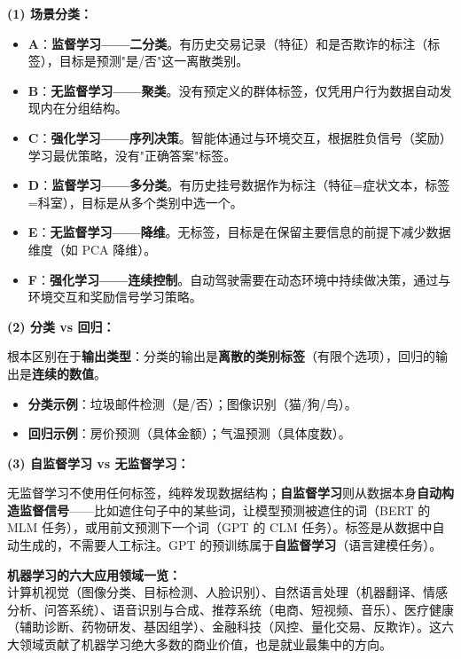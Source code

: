 \documentclass[a4paper,11pt]{ctexart}
\begin{document}
\begin{solutionbox}[参考答案与详细解析]
    \textbf{(1) 场景分类：}
    \begin{itemize}
        \item \textbf{A}：\textbf{监督学习——二分类}。有历史交易记录（特征）和是否欺诈的标注（标签），目标是预测"是/否"这一离散类别。
        \item \textbf{B}：\textbf{无监督学习——聚类}。没有预定义的群体标签，仅凭用户行为数据自动发现内在分组结构。
        \item \textbf{C}：\textbf{强化学习——序列决策}。智能体通过与环境交互，根据胜负信号（奖励）学习最优策略，没有"正确答案"标签。
        \item \textbf{D}：\textbf{监督学习——多分类}。有历史挂号数据作为标注（特征=症状文本，标签=科室），目标是从多个类别中选一个。
        \item \textbf{E}：\textbf{无监督学习——降维}。无标签，目标是在保留主要信息的前提下减少数据维度（如 PCA 降维）。
        \item \textbf{F}：\textbf{强化学习——连续控制}。自动驾驶需要在动态环境中持续做决策，通过与环境交互和奖励信号学习策略。
    \end{itemize}

    \textbf{(2) 分类 vs 回归：}

    根本区别在于\textbf{输出类型}：分类的输出是\textbf{离散的类别标签}（有限个选项），回归的输出是\textbf{连续的数值}。
    \begin{itemize}
        \item \textbf{分类示例}：垃圾邮件检测（是/否）；图像识别（猫/狗/鸟）。
        \item \textbf{回归示例}：房价预测（具体金额）；气温预测（具体度数）。
    \end{itemize}

    \textbf{(3) 自监督学习 vs 无监督学习：}

    \begin{keybox}[自监督学习的核心思想]
        无监督学习不使用任何标签，纯粹发现数据结构；\textbf{自监督学习}则从数据本身\textbf{自动构造监督信号}——比如遮住句子中的某些词，让模型预测被遮住的词（BERT 的 MLM 任务），或用前文预测下一个词（GPT 的 CLM 任务）。标签是从数据中自动生成的，不需要人工标注。GPT 的预训练属于\textbf{自监督学习}（语言建模任务）。
    \end{keybox}
\end{solutionbox}

\begin{appbox}[现实应用场景]
    \textbf{机器学习的六大应用领域一览：}\\
    计算机视觉（图像分类、目标检测、人脸识别）、自然语言处理（机器翻译、情感分析、问答系统）、语音识别与合成、推荐系统（电商、短视频、音乐）、医疗健康（辅助诊断、药物研发、基因组学）、金融科技（风控、量化交易、反欺诈）。这六大领域贡献了机器学习绝大多数的商业价值，也是就业最集中的方向。
\end{appbox}
\end{document}
